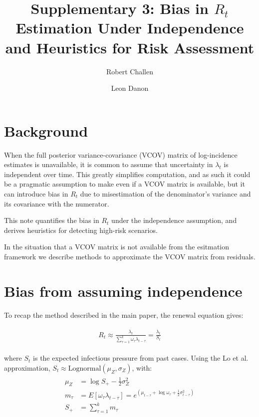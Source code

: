 \documentclass[a4paper, 12pt, twoside]{article}
\title{Supplementary 3: Bias in $ R_t $ Estimation Under Independence and Heuristics for Risk Assessment}
\author[1,2]{Robert Challen}
\author[1,2]{Leon Danon}
\affil[1]{AI4CI, University of Bristol, Bristol, UK.}
\affil[2]{Department of Engineering Mathematics, University of Bristol, Bristol, UK.}
\date{}                     %
\let\Oldsection\section
\renewcommand{\section}{\FloatBarrier\Oldsection}
\begin{document}
\maketitle

\section{Background}

When the full posterior variance-covariance (VCOV) matrix of log-incidence estimates is unavailable, it is common to assume that uncertainty in $ \lambda_t $ is independent over time. This greatly simplifies computation, and as such it could be a pragmatic assumption to make even if a VCOV matrix is available, but it can introduce bias in $ R_t $ due to misestimation of the denominator’s variance and its covariance with the numerator.

This note quantifies the bias in $ R_t $ under the independence assumption, and derives heuristics for detecting high-risk scenarios.

In the situation that a VCOV matrix is not available from the esitmation framework we describe methods to approximate the VCOV matrix from residuals.

\section{Bias from assuming independence}

To recap the method described in the main paper, the renewal equation gives:

\begin{eqnarray}
\begin{aligned}
R_t \approx \frac{\lambda_t}{\sum_{\tau=1}^k \omega_\tau \lambda_{t-\tau}} = \frac{\lambda_t}{S_t}
\end{aligned}
\end{eqnarray}

where $ S_t $ is the expected infectious pressure from past cases. Using the Lo et al. \cite{lo2013} approximation, $ S_t \approx \text{Lognormal}(\mu_Z, \sigma_Z) $, with:
\begin{eqnarray}
\begin{aligned}
\mu_Z &= \log S_+ - \frac{1}{2} \sigma_Z^2 \\
m_\tau &= E[\omega_\tau \lambda_{t-\tau}] = e^{\left( \mu_{t-\tau} + \log \omega_\tau + \frac{1}{2} \sigma_{t-\tau}^2 \right)} \\
S_+ &= \sum_{\tau=1}^k m_\tau \\
\end{aligned}
\end{eqnarray}
\end{document}
